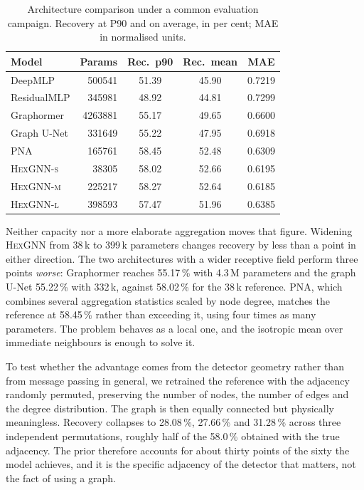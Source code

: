 \documentclass[10pt,conference]{IEEEtran}
\begin{document}
\begin{table}[t]
\centering
\caption{Architecture comparison under a common evaluation campaign. Recovery
at P90 and on average, in per cent; MAE in normalised units.}
\label{tab:architectures}
\begin{tabular}{@{}lrccc@{}}
\toprule
\textbf{Model} & \textbf{Params} & \textbf{Rec.\ p90} & \textbf{Rec.\ mean} & \textbf{MAE} \\
\midrule
DeepMLP           & \num{500541}  & 51.39 & 45.90 & 0.7219 \\
ResidualMLP       & \num{345981}  & 48.92 & 44.81 & 0.7299 \\
Graphormer        & \num{4263881} & 55.17 & 49.65 & 0.6600 \\
Graph U-Net       & \num{331649}  & 55.22 & 47.95 & 0.6918 \\
PNA               & \num{165761}  & 58.45 & 52.48 & 0.6309 \\
\textsc{HexGNN-s} & \num{38305}   & 58.02 & 52.66 & 0.6195 \\
\textsc{HexGNN-m} & \num{225217}  & 58.27 & 52.64 & 0.6185 \\
\textsc{HexGNN-l} & \num{398593}  & 57.47 & 51.96 & 0.6385 \\
\bottomrule
\end{tabular}
\end{table}
Neither capacity nor a more elaborate aggregation moves that figure. Widening
\textsc{HexGNN} from 38\,k to 399\,k parameters changes recovery by less than a
point in either direction. The two architectures with a wider receptive field
perform three points \emph{worse}: Graphormer reaches 55.17\,\% with 4.3\,M
parameters and the graph U-Net 55.22\,\% with 332\,k, against 58.02\,\% for the
38\,k reference. PNA, which combines several aggregation statistics scaled by
node degree, matches the reference at 58.45\,\% rather than exceeding it, using
four times as many parameters. The problem behaves as a local
one, and the isotropic mean over immediate neighbours is enough to solve it.

To test whether the advantage comes from the detector geometry rather than from
message passing in general, we retrained the reference with the adjacency
randomly permuted, preserving the number of nodes, the number of edges and the
degree distribution. The graph is then equally connected but physically
meaningless. Recovery collapses to 28.08\,\%, 27.66\,\% and 31.28\,\% across three
independent permutations, roughly half of the 58.0\,\% obtained with the true
adjacency. The prior therefore accounts for about thirty points of the sixty
the model achieves, and it is the specific adjacency of the detector that
matters, not the fact of using a graph.
\end{document}
